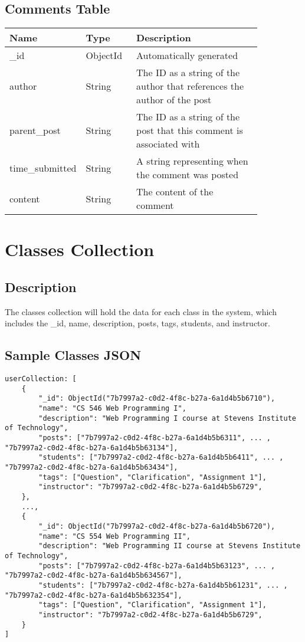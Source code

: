 \documentclass[preprint,11pt,3p]{article}
\begin{document}
\subsection{Comments Table}
\begingroup
\setlength{\tabcolsep}{15pt} %
\renewcommand{\arraystretch}{1.5} %
\begin{tabular}{| p{0.15\linewidth} | p{0.20\linewidth} | p{0.5\linewidth} |}
	\hline
	\textbf{Name} & \textbf{Type} & \textbf{Description} \\
	\hline
	_id & ObjectId & Automatically generated\\
	\hline
	author & String & The ID as a string of the author that references the author of the post\\
	\hline
	parent_post & String & The ID as a string of the post that this comment is associated with\\
	\hline
	time_submitted & String & A string representing when the comment was posted\\
	\hline
	content & String & The content of the comment\\
	\hline
\end{tabular}
\endgroup


\newpage

\section{Classes Collection}

\subsection{Description}
	The classes collection will hold the data for each class in the system, which includes the _id, name, description, posts, tags, students, and instructor.

\subsection{Sample Classes JSON}
\begin{lstlisting}
userCollection: [
	{
		"_id": ObjectId("7b7997a2-c0d2-4f8c-b27a-6a1d4b5b6710"),
		"name": "CS 546 Web Programming I",
		"description": "Web Programming I course at Stevens Institute of Technology",
		"posts": ["7b7997a2-c0d2-4f8c-b27a-6a1d4b5b6311", ... , "7b7997a2-c0d2-4f8c-b27a-6a1d4b5b63134"],
		"students": ["7b7997a2-c0d2-4f8c-b27a-6a1d4b5b6411", ... , "7b7997a2-c0d2-4f8c-b27a-6a1d4b5b63434"],
		"tags": ["Question", "Clarification", "Assignment 1"],
		"instructor": "7b7997a2-c0d2-4f8c-b27a-6a1d4b5b6729",
	},
	...,
	{
		"_id": ObjectId("7b7997a2-c0d2-4f8c-b27a-6a1d4b5b6720"),
		"name": "CS 554 Web Programming II",
		"description": "Web Programming II course at Stevens Institute of Technology",
		"posts": ["7b7997a2-c0d2-4f8c-b27a-6a1d4b5b63123", ... , "7b7997a2-c0d2-4f8c-b27a-6a1d4b5b634567"],
		"students": ["7b7997a2-c0d2-4f8c-b27a-6a1d4b5b61231", ... , "7b7997a2-c0d2-4f8c-b27a-6a1d4b5b632354"],
		"tags": ["Question", "Clarification", "Assignment 1"],
		"instructor": "7b7997a2-c0d2-4f8c-b27a-6a1d4b5b6729",
	}
]
\end{lstlisting}
\end{document}
